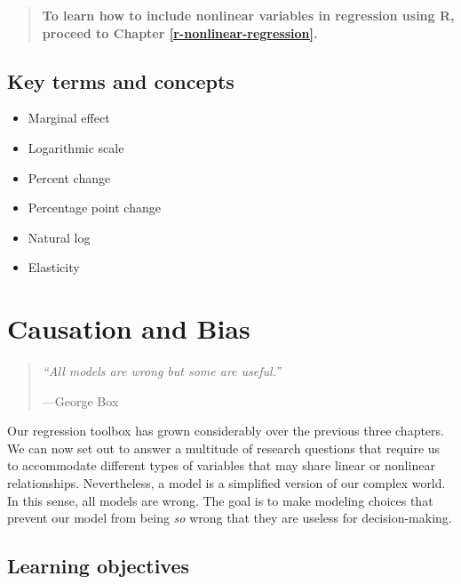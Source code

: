 \documentclass[
]{book}
\providecommand{\tightlist}{%
  \setlength{\itemsep}{0pt}\setlength{\parskip}{0pt}}
\newenvironment{learncheck}%
{%
  \par\vspace{\baselineskip}\noindent 
  \color{Exercise}\begin{itshape}%
  \par\vspace{\baselineskip}\noindent\ignorespaces 
}%
{%
  \end{itshape}\ignorespacesafterend 
}
\begin{document}
\begin{quote}
\textbf{To learn how to include nonlinear variables in regression using R, proceed to Chapter \ref{r-nonlinear-regression}.}
\end{quote}

\hypertarget{kt8}{%
\section{Key terms and concepts}\label{kt8}}

\begin{learncheck}
\begin{itemize}
\tightlist
\item
  Marginal effect
\item
  Logarithmic scale
\item
  Percent change
\item
  Percentage point change
\item
  Natural log
\item
  Elasticity
\end{itemize}
\end{learncheck}

\hypertarget{causation-and-bias}{%
\chapter{Causation and Bias}\label{causation-and-bias}}

\begin{quote}
\emph{``All models are wrong but some are useful.''}

---George Box
\end{quote}

Our regression toolbox has grown considerably over the previous three chapters. We can now set out to answer a multitude of research questions that require us to accommodate different types of variables that may share linear or nonlinear relationships. Nevertheless, a model is a simplified version of our complex world. In this sense, all models are wrong. The goal is to make modeling choices that prevent our model from being \emph{so} wrong that they are useless for decision-making.

\hypertarget{lo9}{%
\section{Learning objectives}\label{lo9}}
\end{document}
